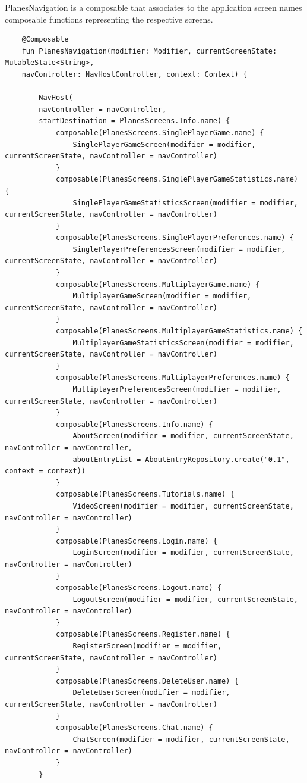 PlanesNavigation is a composable that associates to the application screen names composable functions representing the respective screens.

\begin{lstlisting}
	@Composable
	fun PlanesNavigation(modifier: Modifier, currentScreenState: MutableState<String>,
	navController: NavHostController, context: Context) {
		
		NavHost(
		navController = navController,
		startDestination = PlanesScreens.Info.name) {
			composable(PlanesScreens.SinglePlayerGame.name) {
				SinglePlayerGameScreen(modifier = modifier, currentScreenState, navController = navController)
			}
			composable(PlanesScreens.SinglePlayerGameStatistics.name) {
				SinglePlayerGameStatisticsScreen(modifier = modifier, currentScreenState, navController = navController)
			}
			composable(PlanesScreens.SinglePlayerPreferences.name) {
				SinglePlayerPreferencesScreen(modifier = modifier, currentScreenState, navController = navController)
			}
			composable(PlanesScreens.MultiplayerGame.name) {
				MultiplayerGameScreen(modifier = modifier, currentScreenState, navController = navController)
			}
			composable(PlanesScreens.MultiplayerGameStatistics.name) {
				MultiplayerGameStatisticsScreen(modifier = modifier, currentScreenState, navController = navController)
			}
			composable(PlanesScreens.MultiplayerPreferences.name) {
				MultiplayerPreferencesScreen(modifier = modifier, currentScreenState, navController = navController)
			}
			composable(PlanesScreens.Info.name) {
				AboutScreen(modifier = modifier, currentScreenState, navController = navController,
				aboutEntryList = AboutEntryRepository.create("0.1", context = context))
			}
			composable(PlanesScreens.Tutorials.name) {
				VideoScreen(modifier = modifier, currentScreenState, navController = navController)
			}
			composable(PlanesScreens.Login.name) {
				LoginScreen(modifier = modifier, currentScreenState, navController = navController)
			}
			composable(PlanesScreens.Logout.name) {
				LogoutScreen(modifier = modifier, currentScreenState, navController = navController)
			}
			composable(PlanesScreens.Register.name) {
				RegisterScreen(modifier = modifier, currentScreenState, navController = navController)
			}
			composable(PlanesScreens.DeleteUser.name) {
				DeleteUserScreen(modifier = modifier, currentScreenState, navController = navController)
			}
			composable(PlanesScreens.Chat.name) {
				ChatScreen(modifier = modifier, currentScreenState, navController = navController)
			}
		}
\end{lstlisting}

